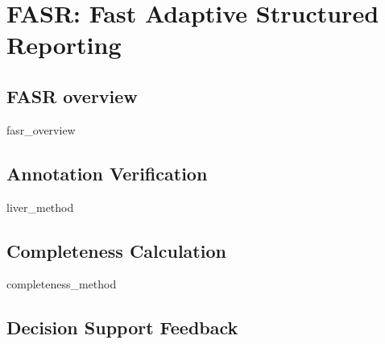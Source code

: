\chapter{FASR: Fast Adaptive Structured Reporting}


\section{FASR overview}
{fasr_overview}


\clearpage

\section{Annotation Verification}
{liver_method}

\clearpage
\section{Completeness Calculation}
{completeness_method}

\clearpage
\section{Decision Support Feedback}


